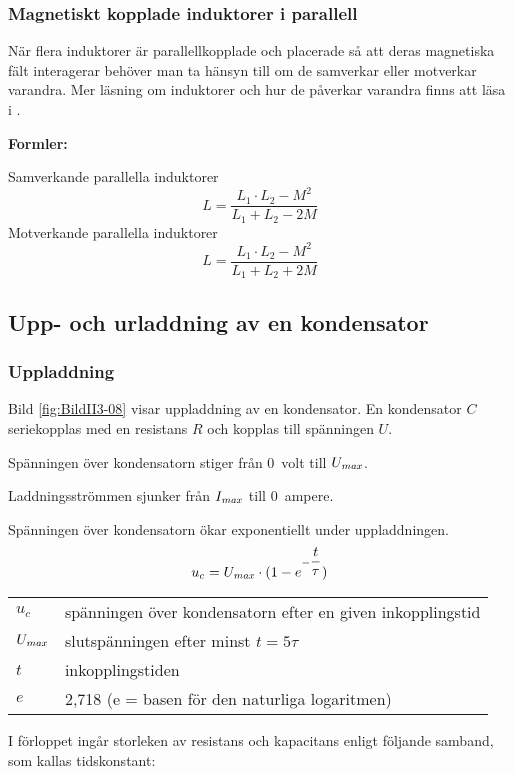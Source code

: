 \subsubsection{Magnetiskt kopplade induktorer i parallell}
När flera induktorer är parallellkopplade och placerade så att deras magnetiska
fält interagerar behöver man ta hänsyn till om de samverkar eller motverkar varandra.
Mer läsning om induktorer och hur de påverkar varandra finns att läsa i
\cite{letrafo}.

\textbf{Formler:}

Samverkande parallella induktorer
%
\[L = \frac{L_1 \cdot L_2 - M^2}{L_1 + L_2 - 2M}\]
%
Motverkande parallella induktorer
%
\[L = \frac{L_1 \cdot L_2 - M^2}{L_1 + L_2 + 2M}\]
%
\subsection{Upp- och urladdning av en kondensator}

\subsubsection{Uppladdning}


Bild \ref{fig:BildII3-08} visar uppladdning av en kondensator.
En kondensator \(C\) seriekopplas med en resistans \(R\)
och kopplas till spänningen \(U\).


Spänningen över kondensatorn stiger från 0~volt till \(U_{\it max}\).

Laddningsströmmen sjunker från \(I_{\it max}\) till 0~ampere.

Spänningen över kondensatorn ökar exponentiellt under uppladdningen.
%
\[u_c = U_{\it max} \cdot ( 1 - e^{-\dfrac{t}{\tau}} )\]
%
\begin{tabular}{lp{}}
  \(u_c\)     & spänningen över kondensatorn efter en given inkopplingstid \\
  \(U_{\it max}\) & slutspänningen efter minst \(t = 5\tau\) \\
  \(t\)       & inkopplingstiden \\
  \(e\)       & 2,718 (e = basen för den naturliga logaritmen) \\
\end{tabular}

I förloppet ingår storleken av resistans och kapacitans enligt följande samband,
som kallas tidskonstant:

